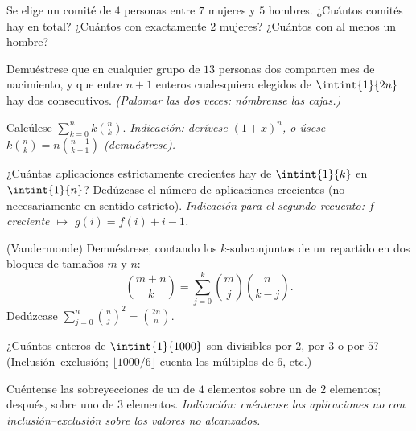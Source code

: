 \begin{exercise}[$\star$]\label{exo:b1:counting:3}
Se elige un comité de $4$ personas entre $7$ mujeres y $5$ hombres.
¿Cuántos comités hay en total? ¿Cuántos con exactamente $2$ mujeres?
¿Cuántos con al menos un hombre?
\end{exercise}

\begin{exercise}[$\star$]\label{exo:b1:counting:4}
Demuéstrese que en cualquier grupo de $13$ personas dos comparten mes de
nacimiento, y que entre $n + 1$ enteros cualesquiera elegidos de
$\intint{1}{2n}$ hay dos consecutivos. \emph{(Palomar las dos veces:
nómbrense las cajas.)}
\end{exercise}

\begin{exercise}[$\star$]\label{exo:b1:counting:5}
Calcúlese $\sum_{k=0}^{n} k \binom{n}{k}$. \emph{Indicación: derívese
$(1 + x)^n$, o úsese $k \binom nk = n \binom{n-1}{k-1}$ (demuéstrese).}
\end{exercise}

\begin{exercise}[$\star\star$]\label{exo:b1:counting:6}
¿Cuántas aplicaciones estrictamente crecientes hay de $\intint{1}{k}$
en $\intint{1}{n}$? Dedúzcase el número de aplicaciones crecientes (no
necesariamente en sentido estricto). \emph{Indicación para el segundo
recuento: $f$ creciente $\mapsto$ $g(i) = f(i) + i - 1$.}
\end{exercise}

\begin{exercise}[$\star\star$]\label{exo:b1:counting:7}
(Vandermonde) Demuéstrese, contando los $k$-subconjuntos de un
 repartido en dos bloques de tamaños $m$ y $n$:
\[
\binom{m+n}{k} = \sum_{j=0}^{k} \binom{m}{j} \binom{n}{k-j} .
\]
Dedúzcase $\sum_{j=0}^{n} \binom nj^2 = \binom{2n}{n}$.
\end{exercise}

\begin{exercise}[$\star\star$]\label{exo:b1:counting:8}
¿Cuántos enteros de $\intint{1}{1000}$ son divisibles por $2$, por $3$ o
por $5$? (Inclusión--exclusión; $\lfloor 1000/6 \rfloor$ cuenta los
múltiplos de $6$, etc.)
\end{exercise}

\begin{exercise}[$\star\star$]\label{exo:b1:counting:9}
Cuéntense las sobreyecciones de un  de $4$ elementos sobre un
 de $2$ elementos; después, sobre uno de $3$ elementos.
\emph{Indicación: cuéntense las aplicaciones no  con
inclusión--exclusión sobre los valores no alcanzados.}
\end{exercise}

